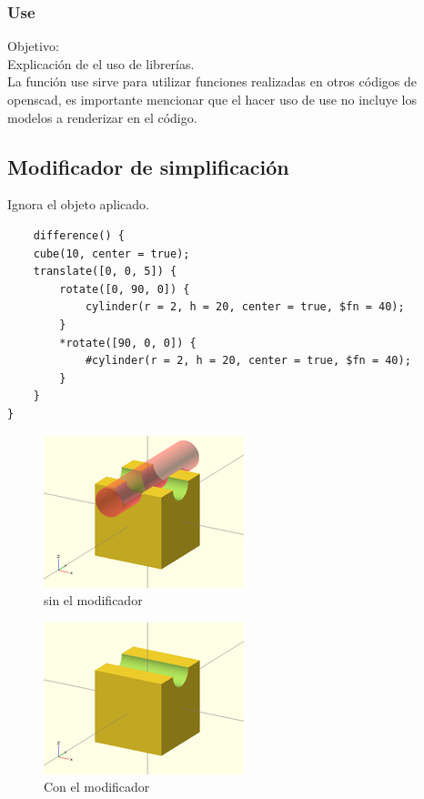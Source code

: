 \documentclass{article}
\begin{document}
\subsubsection{Use}

Objetivo:\\

Explicación de el uso de librerías.\citep{OpenSCS}\\

La función use sirve para utilizar funciones realizadas en otros códigos de openscad, es importante mencionar que el hacer uso de use no incluye los modelos a renderizar en el código.\\

\subsection{Modificador de simplificación}

Ignora el objeto aplicado.\citep{OpenSCS}\\

\begin{verbatim}
    difference() {
	cube(10, center = true);
	translate([0, 0, 5]) {
		rotate([0, 90, 0]) {
			cylinder(r = 2, h = 20, center = true, $fn = 40);
		}
		*rotate([90, 0, 0]) {
			#cylinder(r = 2, h = 20, center = true, $fn = 40);
		}
	}
}
\end{verbatim}

\begin{figure}[h!]
    \centering
    \includegraphics[scale=0.5]{Imagenes/OpenSCAD_Disable_Modifier_(off).png}
    \caption{sin el modificador}
    \label{fig:my_label}
\end{figure}

\begin{figure}[h!]
    \centering
    \includegraphics[scale=0.5]{Imagenes/OpenSCAD_Disable_Modifier_(on).png}
    \caption{Con el modificador}
    \label{fig:my_label}
\end{figure}




\end{document}
